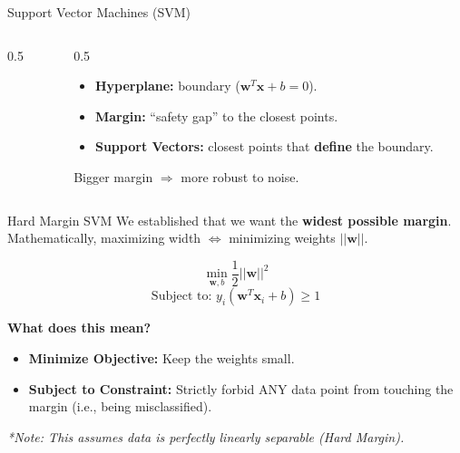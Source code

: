 \begin{frame}{Support Vector Machines (SVM)}
\begin{columns}[c]
\begin{column}{0.5\textwidth}
        \end{column}

        \begin{column}{0.5\textwidth}
            \begin{itemize}
                \item \textbf{Hyperplane:} boundary ($\mathbf{w}^T\mathbf{x} + b = 0$).
                \item \textbf{Margin:} “safety gap” to the closest points.
                \item \textbf{Support Vectors:} closest points that \textbf{define} the boundary.
            \end{itemize}

            \vspace{0.4em}
            \begin{tcolorbox}[colback=yellow!10, colframe=orange!70, boxsep=3pt]
                \small Bigger margin $\Rightarrow$ more robust to noise.
            \end{tcolorbox}
        \end{column}
    \end{columns}
\end{frame}

\begin{frame}{Hard Margin SVM}
    We established that we want the \textbf{widest possible margin}.
    Mathematically, maximizing width $\Longleftrightarrow$ minimizing weights $||\mathbf{w}||$.

    \vspace{0.5em}
    \begin{tcolorbox}[colback=white, colframe=black, title=\textbf{The "Hard Margin" Objective}]
        $$ \min_{\mathbf{w}, b} \frac{1}{2} ||\mathbf{w}||^2 $$
        $$ \text{Subject to: } y_i (\mathbf{w}^T \mathbf{x}_i + b) \geq 1 $$
    \end{tcolorbox}

    \vspace{0.5em}
    \begin{tcolorbox}[colback=blue!5, colframe=blue!60, boxsep=4pt]
        \textbf{What does this mean?}
        \begin{itemize}
            \item \textbf{Minimize Objective:} Keep the weights small.
            \item \textbf{Subject to Constraint:} Strictly forbid ANY data point from touching the margin (i.e., being misclassified).
        \end{itemize}
    \end{tcolorbox}
    \centering \footnotesize \textit{*Note: This assumes data is perfectly linearly separable (Hard Margin).}
\end{frame}

